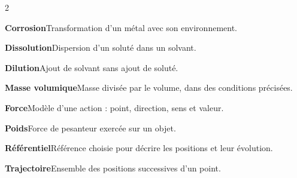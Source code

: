 \begin{multicols}{2}
\par\addvspace{2mm}\noindent\begin{minipage}{\linewidth}\textbf{Corrosion}\enspace Transformation d’un métal avec son environnement.\par\end{minipage}\par
\par\addvspace{2mm}\noindent\begin{minipage}{\linewidth}\textbf{Dissolution}\enspace Dispersion d’un soluté dans un solvant.\par\end{minipage}\par
\par\addvspace{2mm}\noindent\begin{minipage}{\linewidth}\textbf{Dilution}\enspace Ajout de solvant sans ajout de soluté.\par\end{minipage}\par
\par\addvspace{2mm}\noindent\begin{minipage}{\linewidth}\textbf{Masse volumique}\enspace Masse divisée par le volume, dans des conditions précisées.\par\end{minipage}\par
\par\addvspace{2mm}\noindent\begin{minipage}{\linewidth}\textbf{Force}\enspace Modèle d’une action : point, direction, sens et valeur.\par\end{minipage}\par
\par\addvspace{2mm}\noindent\begin{minipage}{\linewidth}\textbf{Poids}\enspace Force de pesanteur exercée sur un objet.\par\end{minipage}\par
\par\addvspace{2mm}\noindent\begin{minipage}{\linewidth}\textbf{Référentiel}\enspace Référence choisie pour décrire les positions et leur évolution.\par\end{minipage}\par
\par\addvspace{2mm}\noindent\begin{minipage}{\linewidth}\textbf{Trajectoire}\enspace Ensemble des positions successives d’un point.\par\end{minipage}\par

\end{multicols}
